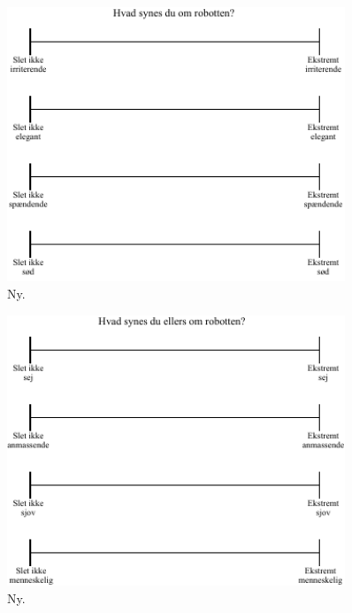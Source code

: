 %
\begin{figure}[H]
\centering
\includegraphics[width = 0.9\textwidth]{Figure/TilpasningAfSkalaer/TilpassetHvadSynesDuOmR} 
\caption{Ny.}
\label{fig:TilpassetHvadSynesDuOmR}
\end{figure}
\noindent
%

%
\begin{figure}[H]
\centering
\includegraphics[width = 0.9\textwidth]{Figure/TilpasningAfSkalaer/HvadSynesDuEllersOmR} 
\caption{Ny.}
\label{fig:TilpassetHvadSynesDuEllersOmR}
\end{figure}
\noindent
%
 